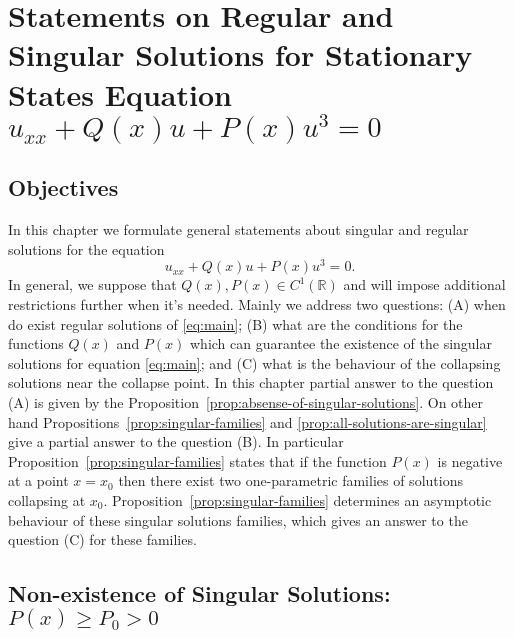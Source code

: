 \chapter{Statements on Regular and Singular Solutions for Stationary States Equation $u_{xx} + Q(x) u + P(x) u^3 = 0$}
\label{chapter:I}

\section{Objectives}

In this chapter we formulate general statements about singular and regular solutions for the equation
\begin{equation}
	u_{xx} + Q(x) u + P(x) u^3 = 0.
	\label{eq:main}
\end{equation}
In general, we suppose that $Q(x), P(x) \in C^1(\mathbb{R})$ and will impose additional restrictions further when it's needed.
Mainly we address two questions: (A) when do exist regular solutions of \eqref{eq:main}; (B) what are the conditions for the functions $Q(x)$ and $P(x)$ which can guarantee the existence of the singular solutions for equation \eqref{eq:main}; and (C) what is the behaviour of the collapsing solutions near the collapse point.
In this chapter partial answer to the question (A) is given by the Proposition~\ref{prop:absense-of-singular-solutions}.
On other hand Propositions~\ref{prop:singular-families} and \ref{prop:all-solutions-are-singular} give a partial answer to the question (B).
In particular Proposition~\ref{prop:singular-families} states that if the function $P(x)$ is negative at a point $x = x_0$ then there exist two one-parametric families of solutions collapsing at $x_0$.
Proposition~\ref{prop:singular-families} determines an asymptotic behaviour of these singular solutions families, which gives an answer to the question (C) for these families.

\section{Non-existence of Singular Solutions: $P(x) \ge P_0 > 0$}

